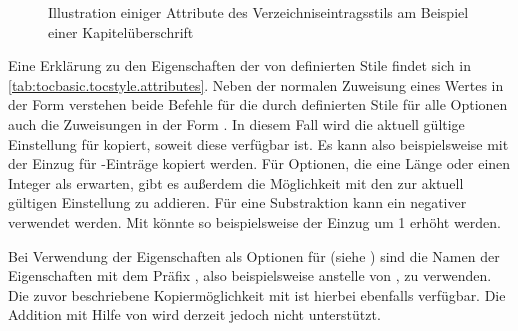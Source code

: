 \begin{description}
\begin{figure}
{%
    }
    \caption{Illustration einiger Attribute des Verzeichniseintragsstils
       am Beispiel einer Kapitelüberschrift}
    \label{fig:tocbasic.undottedtocline}
  \end{figure}
\end{description}
Eine Erklärung zu den Eigenschaften der von  definierten
Stile findet sich in \autoref{tab:tocbasic.tocstyle.attributes}.
Neben der normalen Zuweisung eines Wertes
in der Form  verstehen beide Befehle für
die durch \KOMAScript{} definierten Stile für alle Optionen auch die
Zuweisungen in der Form . In
diesem Fall wird die aktuell gültige Einstellung für 
kopiert, soweit diese verfügbar ist. Es kann also beispielsweise mit
 der Einzug für -Einträge kopiert
werden. Für Optionen, die eine Länge oder einen Integer als 
erwarten, gibt es außerdem die Möglichkeit mit
 den  zur aktuell gültigen
Einstellung zu addieren. Für eine Substraktion kann ein negativer 
verwendet werden. Mit  könnte so beispielsweise der
Einzug um 1 erhöht werden.

Bei Verwendung der Eigenschaften als
Optionen für 
(siehe ) sind die Namen der
Eigenschaften mit dem Präfix , also beispielsweise
 anstelle von , zu verwenden. Die zuvor
beschriebene Kopiermöglichkeit mit \Option{:=} ist hierbei ebenfalls
verfügbar. Die Addition mit Hilfe von \Option{+=} wird derzeit jedoch nicht
unterstützt.

